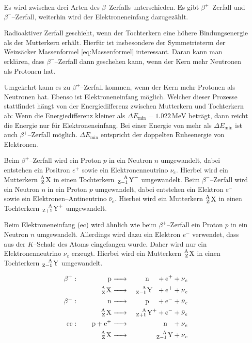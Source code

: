 \documentclass[12pt,a4paper]{scrartcl}
\numberwithin{equation}{section} %
\newcommand{\pu}[1]{\ensuremath{\mathrm{#1}}}
\begin{document}
Es wird zwischen drei Arten des $\beta$--Zerfalls unterschieden. Es gibt $\beta^+$--Zerfall und $\beta^-$--Zerfall, weiterhin wird der Elektroneneinfang dazugezählt.

Radioaktiver Zerfall geschieht, wenn der Tochterkern eine höhere Bindungsenergie als der Mutterkern erhält. Hierfür ist insbesondere der Symmetrieterm der Weizsäcker Massenformel \eqref{eq:Massenformel} interessant. Daran kann man erklären, dass $\beta^-$--Zerfall dann geschehen kann, wenn der Kern mehr Neutronen als Protonen hat.

Umgekehrt kann es zu $\beta^+$--Zerfall kommen, wenn der Kern mehr Protonen als Neutronen hat. Ebenso ist Elektroneneinfang möglich. Welcher dieser Prozesse stattfindet hängt von der Energiedifferenz zwischen Mutterkern und Tochterkern ab: Wenn die Energiedifferenz kleiner als $\Delta E_\mathrm{min}=\pu{1.022\, MeV}$ beträgt, dann reicht die Energie nur für Elektroneneinfang. Bei einer Energie von mehr als $\Delta E_\mathrm{min}$ ist auch $\beta^+$--Zerfall möglich. $\Delta E_\mathrm{min}$ entspricht der doppelten Ruheenergie von Elektronen.

Beim $\beta^+$--Zerfall wird ein Proton $p$ in ein Neutron $n$ umgewandelt, dabei entstehen ein Positron $e^+$ sowie ein Elektronenneutrino $\nu_e$. Hierbei wird ein Mutterkern $\ce{^A_Z X}$ in einen Tochterkern $\ce{^A_{Z-1} Y^-}$ umgewandelt. Beim $\beta^-$--Zerfall wird ein Neutron $n$ in ein Proton $p$ umgewandelt, dabei entstehen ein Elektron $e^-$ sowie ein Elektronen--Antineutrino $\bar{\nu}_e$. Hierbei wird ein Mutterkern $\ce{^A_Z X}$ in einen Tochterkern $\ce{^A_{Z+1} Y^+}$ umgewandelt.

Beim Elektroneneinfang (ec) wird ähnlich wie beim $\beta^+$--Zerfall ein Proton $p$ in ein Neutron $n$ umgewandelt. Allerdings wird dazu ein Elektron $e^-$ verwendet, dass aus der $K$--Schale des Atoms eingefangen wurde. Daher wird nur ein Elektronenneutrino $\nu_e$ erzeugt. Hierbei wird ein Mutterkern $\ce{^A_Z X}$ in einen Tochterkern $\ce{^A_{Z-1} Y}$ umgewandelt.

\begin{eqnarray}
    \beta^+:\qquad\,\,\qquad
        \ce{p} &\ce{->}& \quad \ce{n} \quad\, + \ce{e^+} + \ce{\nu_e} \\
        \ce{^A_Z X} &\ce{->}& \ce{^A_{Z-1} Y^-} + \ce{e^+} + \ce{\nu_e} \\
    \beta^-:\qquad\,\,\qquad
        \ce{n} &\ce{->}& \quad \ce{p} \quad\, + \ce{e^-} + \ce{\bar{\nu}_e} \\
        \ce{^A_Z X} &\ce{->}& \ce{^A_{Z+1} Y^+} + \ce{e^-} + \ce{\bar{\nu}_e} \\
    \text{ec}:\qquad
        \ce{p + e^+} &\ce{->}& \quad \ce{n} \ \ \, + \ce{\nu_e} \\
        \ce{^A_Z X} &\ce{->}& \ce{^A_{Z-1} Y} + \ce{\nu_e}
\end{eqnarray}
\end{document}
